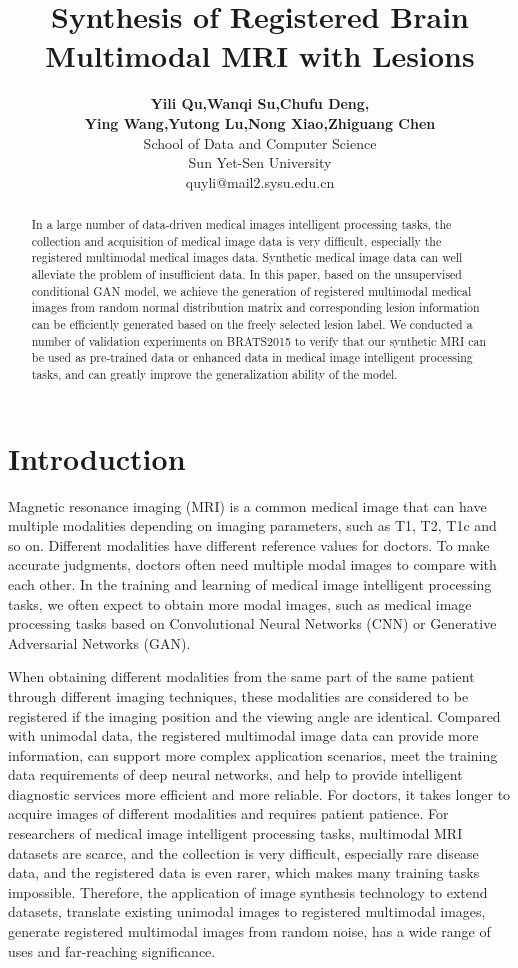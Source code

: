 \documentclass[letterpaper]{article} %
\title{Synthesis of Registered Brain Multimodal MRI with Lesions}
\author{\Large \textbf{Yili Qu,Wanqi Su,Chufu Deng,}\\ \Large \textbf{Ying Wang,Yutong Lu,Nong Xiao,Zhiguang Chen}\\  %
School of Data and Computer Science\\ Sun Yet-Sen University\\	
quyli@mail2.sysu.edu.cn%
}
\begin{document}
\maketitle

\begin{abstract}
In a large number of data-driven medical images intelligent processing tasks, the collection and acquisition of medical image data is very difficult, especially the registered multimodal medical images data. Synthetic medical image data can well alleviate the problem of insufficient data. In this paper, based on the unsupervised conditional GAN model, we achieve the generation of registered multimodal medical images from random normal distribution matrix and corresponding lesion information can be efficiently generated based on the freely selected lesion label. We conducted a number of validation experiments on BRATS2015 to verify that our synthetic MRI can be used as pre-trained data or enhanced data in medical image intelligent processing tasks, and can greatly improve the generalization ability of the model.
\end{abstract}
	
\section{Introduction}
Magnetic resonance imaging (MRI) is a common medical image that can have multiple modalities depending on imaging parameters, such as T1, T2, T1c and so on. Different modalities have different reference values for doctors. To make accurate judgments, doctors often need multiple modal images to compare with each other. In the training and learning of medical image intelligent processing tasks, we often expect to obtain more modal images, such as medical image processing tasks based on Convolutional Neural Networks (CNN)\cite{86krizhevsky2012imagenet} or Generative Adversarial Networks (GAN)\cite{25goodfellow2014generative}. 

When obtaining different modalities from the same part of the same patient  through different imaging techniques, these modalities are considered to be registered if the imaging position and the viewing angle are identical.  Compared with unimodal data, the registered multimodal image data can provide more information, can support more complex application scenarios, meet the training data requirements of deep neural networks, and help to provide  intelligent diagnostic services more efficient and more reliable. For doctors, it takes longer to acquire images of different modalities and requires patient patience. For researchers of medical image intelligent processing tasks, multimodal MRI datasets are scarce, and the collection is very difficult, especially rare disease data, and the registered data is even rarer, which makes many training tasks impossible. Therefore, the application of image synthesis technology to extend datasets, translate existing unimodal images to registered multimodal images, generate registered multimodal images from random noise, has a wide range of uses and far-reaching significance.
\end{document}

